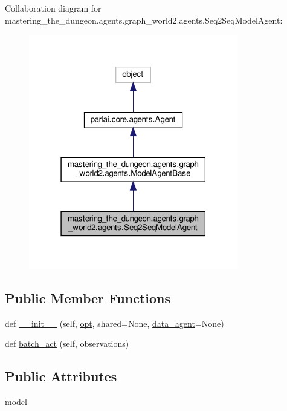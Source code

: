 Collaboration diagram for mastering\+\_\+the\+\_\+dungeon.\+agents.\+graph\+\_\+world2.\+agents.\+Seq2\+Seq\+Model\+Agent\+:
\nopagebreak
\begin{figure}[H]
\begin{center}
\leavevmode
\includegraphics[width=259pt]{classmastering__the__dungeon_1_1agents_1_1graph__world2_1_1agents_1_1Seq2SeqModelAgent__coll__graph}
\end{center}
\end{figure}
\subsection*{Public Member Functions}
\begin{DoxyCompactItemize}
\item 
def \hyperlink{classmastering__the__dungeon_1_1agents_1_1graph__world2_1_1agents_1_1Seq2SeqModelAgent_a14e0cf94bef0e2e9685733942cf421a1}{\+\_\+\+\_\+init\+\_\+\+\_\+} (self, \hyperlink{classparlai_1_1core_1_1agents_1_1Agent_ab3b45d2754244608c75d4068b90cd051}{opt}, shared=None, \hyperlink{classmastering__the__dungeon_1_1agents_1_1graph__world2_1_1agents_1_1ModelAgentBase_a3c6da213b730abbba55d22aed93ab5ad}{data\+\_\+agent}=None)
\item 
def \hyperlink{classmastering__the__dungeon_1_1agents_1_1graph__world2_1_1agents_1_1Seq2SeqModelAgent_a22165996af8efddaf0305c4bfb89ee0f}{batch\+\_\+act} (self, observations)
\end{DoxyCompactItemize}
\subsection*{Public Attributes}
\begin{DoxyCompactItemize}
\item 
\hyperlink{classmastering__the__dungeon_1_1agents_1_1graph__world2_1_1agents_1_1Seq2SeqModelAgent_ac3cd37ced8d808f9e6f2c84e6460da20}{model}
\end{DoxyCompactItemize}


